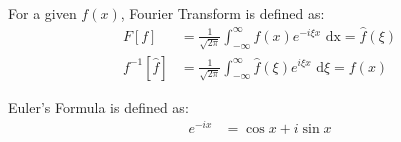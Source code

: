 For a given $f(x)$, Fourier Transform is defined as:
\begin{align}
  F[f] & = \frac{1}{\sqrt {2 \pi}} \int^\infty_{- \infty} f(x) e^{-i \xi x} \text{ dx} = \hat f(\xi)\\
  f^{-1}[\hat f] & = \frac{1}{\sqrt{2 \pi}} \int^\infty_{- \infty} \hat f(\xi) e^{i \xi x} \text{ d}\xi = f(x)
\end{align}

Euler's Formula is defined as:
%
\begin{align}
  e^{-ix} & = \cos x + i \sin x
\end{align}
